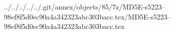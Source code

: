../../../../../.git/annex/objects/85/7z/MD5E-s5223--98ef8f5d0ec90a4a342323abc303bacc.tex/MD5E-s5223--98ef8f5d0ec90a4a342323abc303bacc.tex